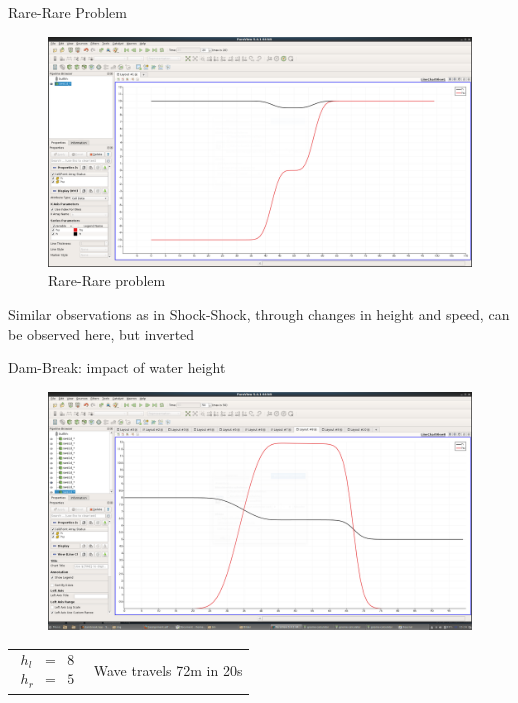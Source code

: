 \documentclass[shortpres]{beamer}
\newcommand{\imgvoffset}{-20pt}
\newcommand{\imgfullscale}{0.75}
\begin{document}
\begin{frame}{Rare-Rare Problem}
	\begin{figure}[t]
		\vspace{\imgvoffset}
		\includegraphics[clip, width=\imgfullscale\linewidth]{img/Rare-Rare.png}
		\caption*{Rare-Rare problem}
	\end{figure}
	\centering
	Similar observations as in Shock-Shock, through changes in height and speed, can be observed here, but inverted
\end{frame}

\begin{frame}{Dam-Break: impact of water height}
	\begin{figure}[t]
		\vspace{\imgvoffset}
		\includegraphics[width=\imgfullscale\linewidth]{img/Dam_hl8_hr5.png}
		\caption*{}
	\end{figure}
	
	\begin{tabular}{m{3cm} m{\linewidth-5cm}}
		$
		\begin{matrix}
		h_l & = & 8\\
		h_r & = & 5
		\end{matrix}
		$
		&
		
		Wave travels 72m in 20s
	\end{tabular}
\end{frame}
\end{document}
